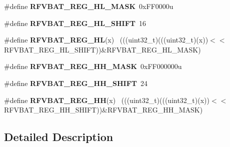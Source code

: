 \begin{DoxyCompactItemize}
\item 
\hypertarget{group___r_f_v_b_a_t___register___masks_gae0f69a55f5feaf1e41b317aaa17780fe}{}\#define {\bfseries R\+F\+V\+B\+A\+T\+\_\+\+R\+E\+G\+\_\+\+H\+L\+\_\+\+M\+A\+S\+K}~0x\+F\+F0000u\label{group___r_f_v_b_a_t___register___masks_gae0f69a55f5feaf1e41b317aaa17780fe}

\item 
\hypertarget{group___r_f_v_b_a_t___register___masks_ga069a18ff685d5c1e8e48acc77454bf70}{}\#define {\bfseries R\+F\+V\+B\+A\+T\+\_\+\+R\+E\+G\+\_\+\+H\+L\+\_\+\+S\+H\+I\+F\+T}~16\label{group___r_f_v_b_a_t___register___masks_ga069a18ff685d5c1e8e48acc77454bf70}

\item 
\hypertarget{group___r_f_v_b_a_t___register___masks_gae16222d2b2ede79d199afaa5da47f0f5}{}\#define {\bfseries R\+F\+V\+B\+A\+T\+\_\+\+R\+E\+G\+\_\+\+H\+L}(x)                                              ~(((uint32\+\_\+t)(((uint32\+\_\+t)(x))$<$$<$R\+F\+V\+B\+A\+T\+\_\+\+R\+E\+G\+\_\+\+H\+L\+\_\+\+S\+H\+I\+F\+T))\&R\+F\+V\+B\+A\+T\+\_\+\+R\+E\+G\+\_\+\+H\+L\+\_\+\+M\+A\+S\+K)\label{group___r_f_v_b_a_t___register___masks_gae16222d2b2ede79d199afaa5da47f0f5}

\item 
\hypertarget{group___r_f_v_b_a_t___register___masks_gad2932f13b6d26fa7ccb982b9cffcd184}{}\#define {\bfseries R\+F\+V\+B\+A\+T\+\_\+\+R\+E\+G\+\_\+\+H\+H\+\_\+\+M\+A\+S\+K}~0x\+F\+F000000u\label{group___r_f_v_b_a_t___register___masks_gad2932f13b6d26fa7ccb982b9cffcd184}

\item 
\hypertarget{group___r_f_v_b_a_t___register___masks_gae67376345507e381e7f56f8bae49359c}{}\#define {\bfseries R\+F\+V\+B\+A\+T\+\_\+\+R\+E\+G\+\_\+\+H\+H\+\_\+\+S\+H\+I\+F\+T}~24\label{group___r_f_v_b_a_t___register___masks_gae67376345507e381e7f56f8bae49359c}

\item 
\hypertarget{group___r_f_v_b_a_t___register___masks_gadfc5bbcb901243c01dd0233b4ca94eb7}{}\#define {\bfseries R\+F\+V\+B\+A\+T\+\_\+\+R\+E\+G\+\_\+\+H\+H}(x)                                              ~(((uint32\+\_\+t)(((uint32\+\_\+t)(x))$<$$<$R\+F\+V\+B\+A\+T\+\_\+\+R\+E\+G\+\_\+\+H\+H\+\_\+\+S\+H\+I\+F\+T))\&R\+F\+V\+B\+A\+T\+\_\+\+R\+E\+G\+\_\+\+H\+H\+\_\+\+M\+A\+S\+K)\label{group___r_f_v_b_a_t___register___masks_gadfc5bbcb901243c01dd0233b4ca94eb7}

\end{DoxyCompactItemize}


\subsection{Detailed Description}
